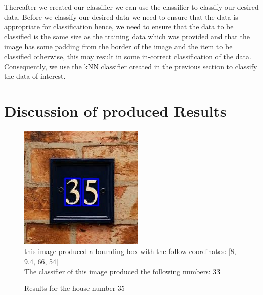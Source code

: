 \documentclass[
	12pt, %
]{fphw}
\begin{document}
Thereafter we created our classifier we can use the classifier to classify our desired data. Before we classify our desired data we need to ensure that the data is appropriate for classification hence, we need to ensure that the data to be classified is the same size as the training data which was provided and that the image has some padding from the border of the image and the item to be classified otherwise, this may result in some in-correct classification of the data. Consequently, we use the kNN classifier created in the previous section to classify the data of interest.

\newpage
\part{Discussion of produced Results}
\newpage
\begin{figure}[htp]
	\begin{problem}
	\begin{center}
	\includegraphics[width=0.25\linewidth]{"output/DetectedArea0"}
	\\this image produced a bounding box with the follow coordinates: [8, 9.4, 66, 54]\\
	The classifier of this image produced the following numbers: 33

	\end{center}
	\end{problem}
	\caption{Results for the house number 35}
	\label{Results for the house number 35}
\end{figure}
\end{document}

